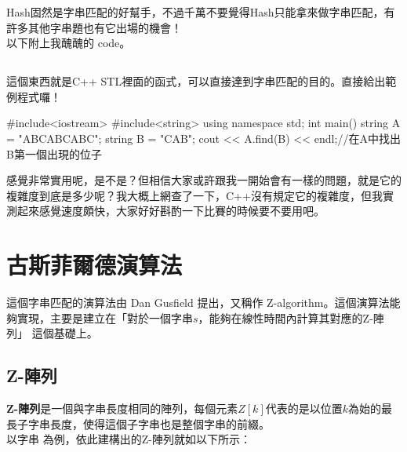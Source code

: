 Hash固然是字串匹配的好幫手，不過千萬不要覺得Hash只能拿來做字串匹配，有許多其他字串題也有它出場的機會！\\

以下附上我醜醜的 code。

\subsection{}
這個東西就是C++ STL裡面的函式，可以直接達到字串匹配的目的。直接給出範例程式囉！
\begin{C++}
#include<iostream>
#include<string>
using namespace std;
int main()
{
  string A = "ABCABCABC";
  string B = "CAB";
  cout << A.find(B) << endl;//在A中找出B第一個出現的位子
}
\end{C++}
感覺非常實用呢，是不是？但相信大家或許跟我一開始會有一樣的問題，就是它的複雜度到底是多少呢？我大概上網查了一下，C++沒有規定它的複雜度，但我實測起來感覺速度頗快，大家好好斟酌一下比賽的時候要不要用吧。

\section{古斯菲爾德演算法}

這個字串匹配的演算法由 Dan Gusfield 提出，又稱作 Z-algorithm。這個演算法能夠實現，主要是建立在「對於一個字串$s$，能夠在線性時間內計算其對應的Z-陣列」 這個基礎上。\\

\subsection{Z-陣列}

\textbf{Z-陣列}是一個與字串長度相同的陣列，每個元素$Z[k]$代表的是以位置$k$為始的最長子字串長度，使得這個子字串也是整個字串的前綴。\\

以字串 為例，依此建構出的Z-陣列就如以下所示：\\

